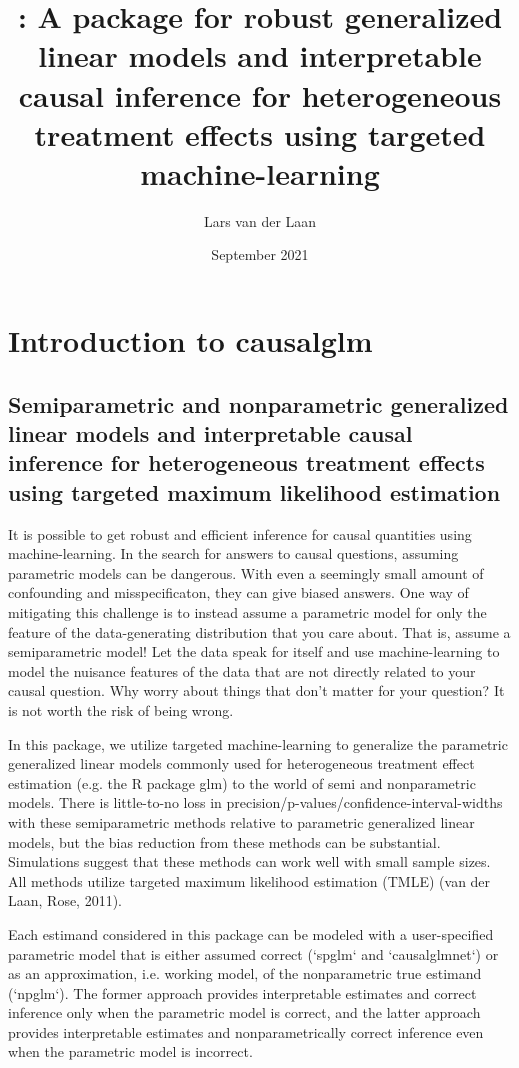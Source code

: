 \documentclass[article]{jss}
\title{%
  \pkg{causalglm}: A \pkg{tlverse} \proglang{R} package for robust generalized linear models and interpretable causal inference for heterogeneous treatment effects using targeted machine-learning
  }
\author{Lars van der Laan }
\date{September 2021}
\begin{document}

 

\maketitle



\section{Introduction to causalglm}
\subsection{Semiparametric and nonparametric generalized linear models and interpretable causal inference for heterogeneous treatment effects using targeted maximum likelihood estimation}


It is possible to get robust and efficient inference for causal quantities using machine-learning. In the search for answers to causal questions, assuming parametric models can be dangerous. With even a seemingly small amount of confounding and misspecificaton, they can give biased answers. One way of mitigating this challenge is to instead assume a parametric model for only the feature of the data-generating distribution that you care about. That is, assume a semiparametric model! Let the data speak for itself and use machine-learning to model the nuisance features of the data that are not directly related to your causal question. Why worry about things that don't matter for your question? It is not worth the risk of being wrong.

In this package, we utilize targeted machine-learning to generalize the parametric generalized linear models commonly used for heterogeneous treatment effect estimation (e.g. the R package glm) to the world of semi and nonparametric models. There is little-to-no loss in precision/p-values/confidence-interval-widths with these semiparametric methods relative to parametric generalized linear models, but the bias reduction from these methods can be substantial. Simulations suggest that these methods can work well with small sample sizes. All methods utilize targeted maximum likelihood estimation (TMLE) (van der Laan, Rose, 2011).\nocite{vanderLaanRose2011}

Each estimand considered in this package can be modeled with a user-specified parametric model that is either assumed correct (`spglm` and `causalglmnet`) or as an approximation, i.e. working model, of the nonparametric true estimand (`npglm`). The former approach provides interpretable estimates and correct inference only when the parametric model is correct, and the latter approach provides interpretable estimates and nonparametrically correct inference even when the parametric model is incorrect.
\end{document}
